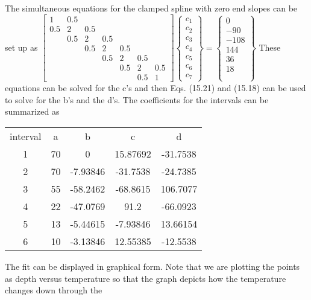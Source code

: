 \documentclass[../main.tex]{subfiles}
\begin{document}
\begin{enumerate}[label=\bfseries(\alph*)]
\section{}
The simultaneous equations for the clamped spline with zero end slopes can be set up as 
	\bigbreak
$
\left[\begin{array}{ccccccc}
1 & 0.5 & & & & & \\
0.5 & 2 & 0.5 & & & & \\
& 0.5 & 2 & 0.5 & & & \\
& & 0.5 & 2 & 0.5 & & \\
& & & 0.5 & 2 & 0.5 & \\
& & & & 0.5 & 2 & 0.5 \\
& & & & & 0.5 & 1
\end{array}\right]\left\{\begin{array}{c}
c_{1} \\
c_{2} \\
c_{3} \\
c_{4} \\
c_{5} \\
c_{6} \\
c_{7}
\end{array}\right\}=\left\{\begin{array}{c}
0 \\
-90 \\
-108 \\
144 \\
36 \\
18 \\
 \\
\end{array}\right\}
$
	\bigbreak
These equations can be solved for the c’s and then Eqs. (15.21) and (15.18) can be used to
solve for the b’s and the d’s. The coefficients for the intervals can be summarized as
	\bigbreak
\begin{tabular}{ccccc}
interval&a&b&c&d\\
1&70&0&15.87692&-31.7538\\
2&70&-7.93846&-31.7538&-24.7385\\
3&55&-58.2462&-68.8615&106.7077\\
4&22&-47.0769&91.2&-66.0923\\
5&13&-5.44615&-7.93846&13.66154\\
6&10&-3.13846&12.55385&-12.5538
\end{tabular}
	\bigbreak
The fit can be displayed in graphical form. Note that we are plotting the points as depth
versus temperature so that the graph depicts how the temperature changes down through the

\end{enumerate}
\end{document}
